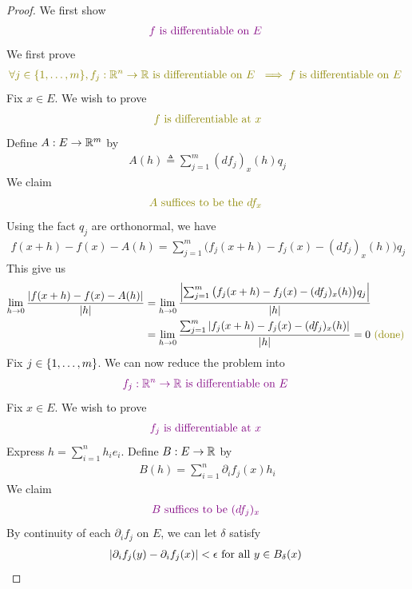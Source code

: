 \documentclass{report}
\begin{document}
\begin{proof}
We first show 
\begin{align*}
\textcolor{violet}{f\text{ is differentiable on $E$ }}
\end{align*}
We first prove 
\begin{align*}
\olive{\forall j\in \set{1,\dots, m}, f_j:\R^n\rightarrow \R\text{ is differentiable on $E$ }\implies f\text{ is differentiable on $E$ }}
\end{align*}
Fix $x\in E$. We wish to prove 
\begin{align*}
\olive{\text{ $f$ is differentiable at $x$ }}
\end{align*}
Define $A:E\rightarrow \mathbb{R}^m$ by 
\begin{align*}
A(h)\triangleq \sum_{j=1}^m  (df_j)_x (h)q_j
\end{align*}
We claim 
\begin{align*}
\olive{A\text{ suffices to be the $df_x$ }}
\end{align*}
Using the fact $q_j$ are orthonormal, we have
\begin{align*}
f(x+h)-f(x)-A(h)=\sum_{j=1}^m \big(f_j(x+h)-f_j(x)-(df_j)_x(h)  \big)q_j
\end{align*}
This give us 
\begin{align*}
\lim_{h\to 0} \frac{\abso{f(x+h)-f(x)-A(h)}}{\abso{h}}&=\lim_{h\to 0} \frac{\abso{\sum_{j=1}^m \big(f_j(x+h)-f_j(x)-(df_j)_x (h) \big)q_j}}{\abso{h}}\\
&=\lim_{h\to 0} \frac{\sum_{j=1}^m \abso{f_j(x+h)-f_j(x)-(df_j)_x(h)}}{\abso{h}}=0 \odone
\end{align*}
Fix $j \in \{ 1,\dots ,m \}$. We can now reduce the problem into 
\begin{align*}
  \textcolor{violet}{f_j:\mathbb{R}^n\rightarrow \mathbb{R}\text{ is differentiable on $E$ }}
\end{align*}
Fix $x \in E$. We wish to prove 
\begin{align*}
\textcolor{violet}{f_j\text{ is differentiable at $x$ }}
\end{align*}
Express $h=\sum_{i=1}^n h_ie_i$. Define $B:E\rightarrow \mathbb{R}$ by
\begin{align*}
B(h)=\sum_{i=1}^n \partial_i f_j(x)h_i
\end{align*}
We claim 
\begin{align*}
\textcolor{violet}{B\text{ suffices to be $(df_j)_x$ }}
\end{align*}
By continuity of each $\partial_i f_j$ on $E$, we can let  $\delta$ satisfy 
\begin{align*}
\abso{\partial_i f_j(y)-\partial_i f_j(x)}< \epsilon  \text{ for all $y\in B_\delta(x)$  }

\end{align*}
\end{proof}
\end{document}
